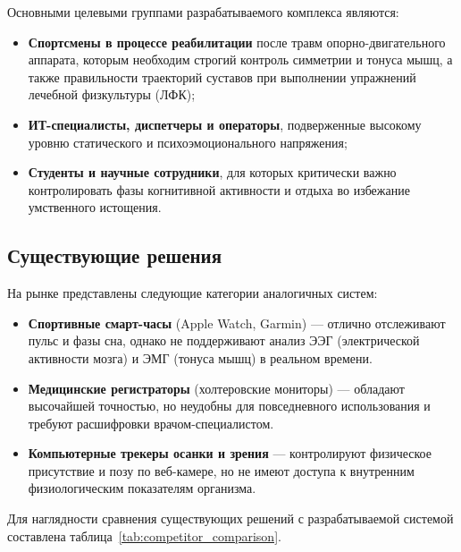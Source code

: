 \documentclass[utf8, russian]{eskdtext}
\begin{document}
Основными целевыми группами разрабатываемого комплекса являются:
\begin{itemize}
    \item \textbf{Спортсмены в процессе реабилитации} после травм опорно-двигательного аппарата, которым необходим строгий контроль симметрии и тонуса мышц, а также правильности траекторий суставов при выполнении упражнений лечебной физкультуры (ЛФК);
    \item \textbf{ИТ-специалисты, диспетчеры и операторы}, подверженные высокому уровню статического и психоэмоционального напряжения;
    \item \textbf{Студенты и научные сотрудники}, для которых критически важно контролировать фазы когнитивной активности и отдыха во избежание умственного истощения.
\end{itemize}

\subsection{Существующие решения}
На рынке представлены следующие категории аналогичных систем:
\begin{itemize}
    \item \textbf{Спортивные смарт-часы} (Apple Watch, Garmin) — отлично отслеживают пульс и фазы сна, однако не поддерживают анализ ЭЭГ (электрической активности мозга) и ЭМГ (тонуса мышц) в реальном времени.
    \item \textbf{Медицинские регистраторы} (холтеровские мониторы) — обладают высочайшей точностью, но неудобны для повседневного использования и требуют расшифровки врачом-специалистом.
    \item \textbf{Компьютерные трекеры осанки и зрения} — контролируют физическое присутствие и позу по веб-камере, но не имеют доступа к внутренним физиологическим показателям организма.
\end{itemize}

Для наглядности сравнения существующих решений с разрабатываемой системой составлена таблица~\ref{tab:competitor_comparison}.
\end{document}
